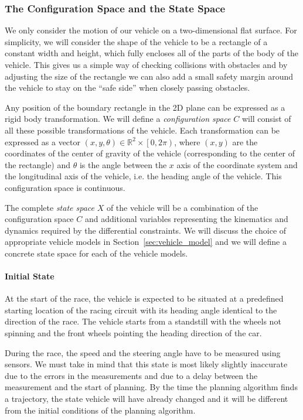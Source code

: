 \subsubsection{The Configuration Space and the State Space}

We only consider the motion of our vehicle on a two-dimensional flat surface. For simplicity, we will consider the shape of the vehicle to be a rectangle of a constant width and height, which fully encloses all of the parts of the body of the vehicle. This gives us a simple way of checking collisions with obstacles and by adjusting the size of the rectangle we can also add a small safety margin around the vehicle to stay on the ``safe side'' when closely passing obstacles.

Any position of the boundary rectangle in the 2D plane can be expressed as a rigid body transformation. We will define a \textit{configuration space} $C$ will consist of all these possible transformations of the vehicle. Each transformation can be expressed as a vector $\left( x, y, \theta\right)\in \mathbb{R}^2\times \left[0, 2\pi\right)$, where $\left( x, y\right)$ are the coordinates of the center of gravity of the vehicle (corresponding to the center of the rectangle) and $\theta$ is the angle between the $x$ axis of the coordinate system and the longitudinal axis of the vehicle, i.e. the heading angle of the vehicle.  This configuration space is continuous.

The complete \textit{state space} $X$ of the vehicle will be a combination of the configuration space $C$ and additional variables representing the kinematics and dynamics required by the differential constraints. We will discuss the choice of appropriate vehicle models in Section~\ref{sec:vehicle_model} and we will define a concrete state space for each of the vehicle models.

\paragraph{Initial State}
At the start of the race, the vehicle is expected to be situated at a predefined starting location of the racing circuit with its heading angle identical to the direction of the race. The vehicle starts from a standstill with the wheels not spinning and the front wheels pointing the heading direction of the car.

During the race, the speed and the steering angle have to be measured using sensors. We must take in mind that this state is most likely slightly inaccurate due to the errors in the measurements and due to a delay between the measurement and the start of planning. By the time the planning algorithm finds a trajectory, the state vehicle will have already changed and it will be different from the initial conditions of the planning algorithm.


